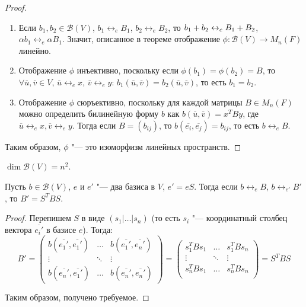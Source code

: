 \begin{proof}~
	\begin{enumerate}
		\item Если $b_1, b_2 \in \mathcal{B}(V)$, $b_1 \leftrightarrow_e B_1$, $b_2 \leftrightarrow_e B_2$, то $b_1 + b_2 \leftrightarrow_e B_1 \hm{+} B_2$, $\alpha b_1 \leftrightarrow_e \alpha B_1$. Значит, описанное в теореме отображение $\phi: \mathcal{B}(V) \rightarrow M_n(F)$ линейно.
		\item Отображение $\phi$ инъективно, поскольку если $\phi(b_1) = \phi(b_2) = B$, то $\forall \overline{u}, \overline{v} \in V$, $\overline{u} \leftrightarrow_e x$, $\overline{v} \leftrightarrow_e y$: $b_1(\overline{u}, \overline{v}) = b_2(\overline{u}, \overline{v})$, то есть $b_1 = b_2$.
		\item Отображение $\phi$ сюръективно, поскольку для каждой матрицы $B \in M_n(F)$ можно определить билинейную форму $b$ как $b(\overline{u}, \overline{v}) = x^TBy$, где $\overline{u} \leftrightarrow_e x, \overline{v} \leftrightarrow_e y$. Тогда если $B = (b_{ij})$, то $b(\overline{e_i}, \overline{e_j}) = b_{ij}$, то есть $b \leftrightarrow_e B$.
	\end{enumerate}
	
	Таким образом, $\phi$ "--- это изоморфизм линейных пространств.
\end{proof}

\begin{corollary}
	$\dim{\mathcal{B}(V)} = n^2$.
\end{corollary}

\begin{theorem}
	Пусть $b \in \mathcal{B}(V)$, $e$ и $e'$ "--- два базиса в $V$, $e' = eS$. Тогда если $b \leftrightarrow_e B$, $b \leftrightarrow_{e'} B'$, то $B' = S^TBS$.
\end{theorem}

\begin{proof}
	Перепишем $S$ в виде $(s_1|\dots|s_n)$ (то есть $s_i$ "--- координатный столбец вектора $\overline{e_i'}$ в базисе $e$). Тогда:
	\[B' = \begin{pmatrix}
		b(\overline{e_1'}, \overline{e_1'})&\dots&b(\overline{e_1'}, \overline{e_n'})\\
		\vdots&\ddots&\vdots\\
		b(\overline{e_n'}, \overline{e_1'})&\dots&b(\overline{e_n'}, \overline{e_n'})
	\end{pmatrix} = \begin{pmatrix}
		s_1^TBs_1&\dots&s_1^TBs_n\\
		\vdots&\ddots&\vdots\\
		s_n^TBs_1&\dots&s_n^TBs_n\\
	\end{pmatrix} = S^TBS\]
	
	Таким образом, получено требуемое.
\end{proof}


